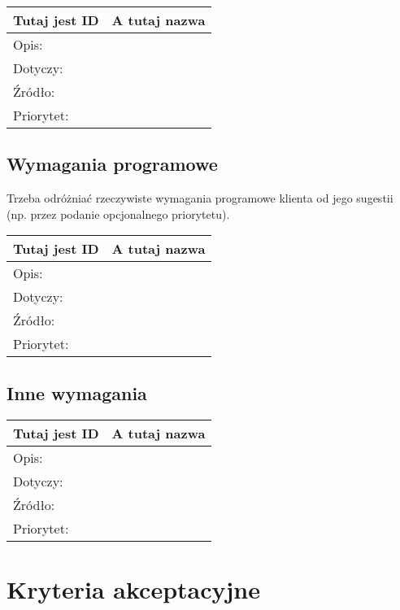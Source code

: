 \documentclass[a4paper,10pt]{article}
\begin{document}
\begin{tabular}{|p{3cm}|p{9cm}|} \hline

Tutaj jest ID & A tutaj nazwa \\ \hline
Opis: &  \\ \hline
Dotyczy: &  \\ \hline
Źródło: &  \\ \hline
Priorytet: &  \\ \hline

\end{tabular}


\subsection{Wymagania programowe}

Trzeba odróżniać rzeczywiste wymagania programowe klienta od jego sugestii (np. przez podanie opcjonalnego priorytetu).


\begin{tabular}{|p{3cm}|p{9cm}|} \hline

Tutaj jest ID & A tutaj nazwa \\ \hline
Opis: &  \\ \hline
Dotyczy: &  \\ \hline
Źródło: &  \\ \hline
Priorytet: &  \\ \hline

\end{tabular}


\subsection{Inne wymagania}
 

\begin{tabular}{|p{3cm}|p{9cm}|} \hline

Tutaj jest ID & A tutaj nazwa \\ \hline
Opis: &  \\ \hline
Dotyczy: &  \\ \hline
Źródło: &  \\ \hline
Priorytet: &  \\ \hline

\end{tabular}

 
\section{Kryteria akceptacyjne}
\end{document}
